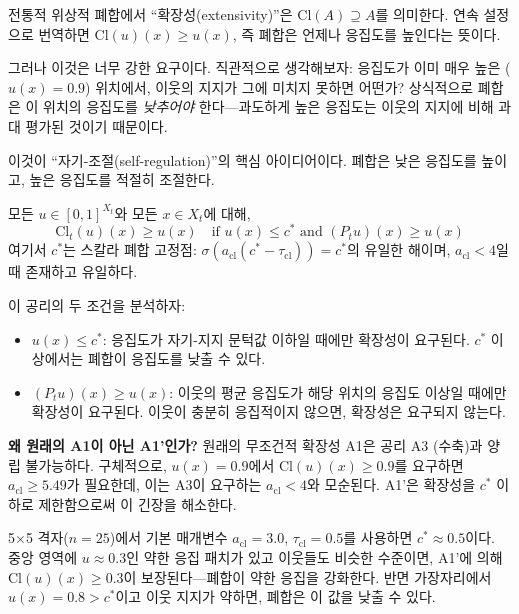 전통적 위상적 폐합에서 ``확장성(extensivity)''은 $\mathrm{Cl}(A) \supseteq A$를 의미한다. 연속 설정으로 번역하면 $\mathrm{Cl}(u)(x) \geq u(x)$, 즉 폐합은 언제나 응집도를 높인다는 뜻이다.

그러나 이것은 너무 강한 요구이다. 직관적으로 생각해보자: 응집도가 이미 매우 높은 ($u(x) = 0.9$) 위치에서, 이웃의 지지가 그에 미치지 못하면 어떤가? 상식적으로 폐합은 이 위치의 응집도를 \emph{낮추어야} 한다---과도하게 높은 응집도는 이웃의 지지에 비해 과대 평가된 것이기 때문이다.

이것이 ``자기-조절(self-regulation)''의 핵심 아이디어이다. 폐합은 낮은 응집도를 높이고, 높은 응집도를 적절히 조절한다.

\begin{axiom}
\label{ax:A1prime}
모든 $u \in [0,1]^{X_t}$와 모든 $x \in X_t$에 대해,
\begin{equation}
    \mathrm{Cl}_t(u)(x) \geq u(x) \quad \text{if } u(x) \leq c^* \text{ and } (P_t u)(x) \geq u(x)
\end{equation}
여기서 $c^*$는 스칼라 폐합 고정점: $\sigma(a_{\mathrm{cl}}(c^* - \tau_{\mathrm{cl}})) = c^*$의 유일한 해이며, $a_{\mathrm{cl}} < 4$일 때 존재하고 유일하다.
\end{axiom}

이 공리의 두 조건을 분석하자:
\begin{itemize}
    \item $u(x) \leq c^*$: 응집도가 자기-지지 문턱값 이하일 때에만 확장성이 요구된다. $c^*$ 이상에서는 폐합이 응집도를 낮출 수 있다.
    \item $(P_t u)(x) \geq u(x)$: 이웃의 평균 응집도가 해당 위치의 응집도 이상일 때에만 확장성이 요구된다. 이웃이 충분히 응집적이지 않으면, 확장성은 요구되지 않는다.
\end{itemize}

\textbf{왜 원래의 A1이 아닌 A1'인가?} 원래의 무조건적 확장성 A1은 공리 A3 (수축)과 양립 불가능하다. 구체적으로, $u(x) = 0.9$에서 $\mathrm{Cl}(u)(x) \geq 0.9$를 요구하면 $a_{\mathrm{cl}} \geq 5.49$가 필요한데, 이는 A3이 요구하는 $a_{\mathrm{cl}} < 4$와 모순된다. A1'은 확장성을 $c^*$ 이하로 제한함으로써 이 긴장을 해소한다.

\begin{example}
5$\times$5 격자($n = 25$)에서 기본 매개변수 $a_{\mathrm{cl}} = 3.0$, $\tau_{\mathrm{cl}} = 0.5$를 사용하면 $c^* \approx 0.5$이다. 중앙 영역에 $u \approx 0.3$인 약한 응집 패치가 있고 이웃들도 비슷한 수준이면, A1'에 의해 $\mathrm{Cl}(u)(x) \geq 0.3$이 보장된다---폐합이 약한 응집을 강화한다. 반면 가장자리에서 $u(x) = 0.8 > c^*$이고 이웃 지지가 약하면, 폐합은 이 값을 낮출 수 있다.
\end{example}



